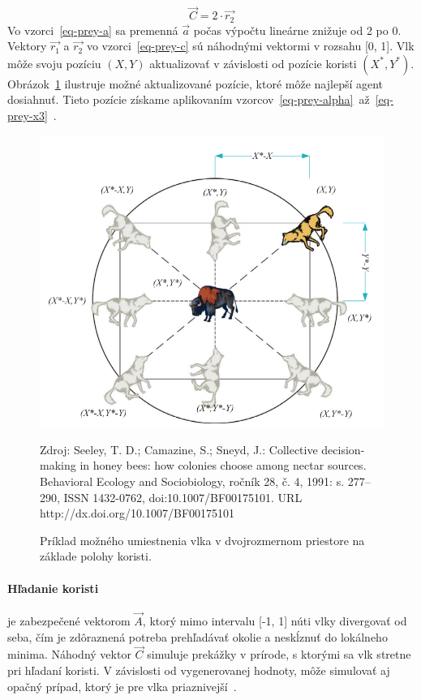 \documentclass[a4paper,slovak,12pt,appendix]{article}
\newcommand{\source}[1]{\caption*{\footnotesize Zdroj: {#1}} }
\begin{document}
\begin{equation}
  \vec{C} = 2 \cdot \vec{r_2}
  \label{eq-prey-c}
\end{equation}
Vo vzorci~\ref{eq-prey-a} sa premenná $\vec{a}$ počas výpočtu lineárne
znižuje od 2 po 0. Vektory $\vec{r_1}$ a $\vec{r_2}$ vo vzorci~\ref{eq-prey-c}
sú náhodnými vektormi v rozsahu [0, 1]. Vlk môže svoju pozíciu $(X, Y)$
aktualizovať v závislosti od pozície koristi $(X^*, Y^*)$.
Obrázok~\ref{fig-wolf-pos} ilustruje možné aktualizované pozície, ktoré môže
najlepší agent dosiahnuť. Tieto pozície získame aplikovaním
vzorcov~\ref{eq-prey-alpha}~až~\ref{eq-prey-x3}~\cite{Seeley1991}.

\begin{figure}[ht]
  \centering
  \includegraphics[width=\textwidth]{wolf_vector_positions.png}
  \caption{Príklad možného umiestnenia vlka v dvojrozmernom priestore na základe polohy koristi.}
	\source{Seeley, T. D.; Camazine, S.; Sneyd, J.: Collective decision-making in
					honey bees: how colonies choose among nectar sources. Behavioral
					Ecology and Sociobiology, ročník 28, č. 4, 1991: s. 277–290, ISSN
					1432-0762, doi:10.1007/BF00175101. URL http://dx.doi.org/10.1007/BF00175101}
  \label{fig-wolf-pos}
\end{figure}

\paragraph{Hľadanie koristi} je zabezpečené vektorom $\vec{A}$, ktorý mimo
intervalu [-1, 1] núti vlky divergovať od seba, čím je zdôraznená potreba
prehľadávať okolie a neskĺznuť do lokálneho minima. Náhodný vektor $\vec{C}$
simuluje prekážky v prírode, s ktorými sa vlk stretne pri hľadaní koristi.
V závislosti od vygenerovanej hodnoty, môže simulovať aj opačný prípad, ktorý
je pre vlka priaznivejší~\cite{Seeley1991}.
\end{document}
